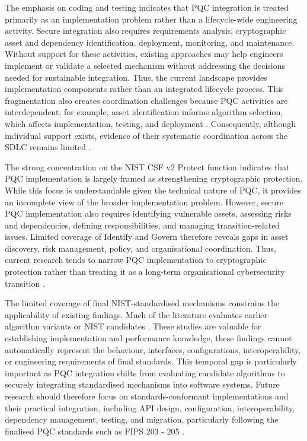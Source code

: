 \documentclass[letterpaper,twocolumn,10pt]{article}
\begin{document}
The emphasis on coding and testing indicates that PQC integration is treated primarily as an implementation problem rather than a lifecycle-wide engineering activity. Secure integration also requires requirements analysis, cryptographic asset and dependency identification, deployment, monitoring, and maintenance. Without support for these activities, existing approaches may help engineers implement or validate a selected mechanism without addressing the decisions needed for sustainable integration. Thus, the current landscape provides implementation components rather than an integrated lifecycle process. This fragmentation also creates coordination challenges because PQC activities are interdependent; for example, asset identification informs algorithm selection, which affects implementation, testing, and deployment \cite{anonymous_pqc_sok_2026}. Consequently, although individual support exists, evidence of their systematic coordination across the SDLC remains limited \cite{Ana_decisionAlgo, Ana_huelsing2021wireguard, Ana_ojha2025adoption, Ana_tsili_scalable_2025, Ana_kannwischer_improving_2022, Ana_e27020212}.

The strong concentration on the NIST CSF v2 Protect function indicates that PQC implementation is largely framed as strengthening cryptographic protection. While this focus is understandable given the technical nature of PQC, it provides an incomplete view of the broader implementation problem. However, secure PQC implementation also requires identifying vulnerable assets, assessing risks and dependencies, defining responsibilities, and managing transition-related issues. Limited coverage of Identify and Govern therefore reveals gaps in asset discovery, risk management, policy, and organisational coordination. Thus, current research tends to narrow PQC implementation to cryptographic protection rather than treating it as a long-term organisational cybersecurity transition \cite{Ana_decisionAlgo}.

The limited coverage of final NIST-standardised mechanisms constrains the applicability of existing findings. Much of the literature evaluates earlier algorithm variants or NIST candidates \cite{Ana_ojha2025adoption, Ana_tsili_scalable_2025, Ana_e27020212, Ana_hekkala_implementing_2023, Ana_huelsing2021wireguard, Ana_saucedo-estrada_post-quantum_2020}. These studies are valuable for establishing implementation and performance knowledge, these findings cannot automatically represent the behaviour, interfaces, configurations, interoperability, or engineering requirements of final standards. This temporal gap is particularly important as PQC integration shifts from evaluating candidate algorithms to securely integrating standardised mechanisms into software systems. Future research should therefore focus on standards-conformant implementations and their practical integration, including API design, configuration, interoperability, dependency management, testing, and migration, particularly following the finalised PQC standards such as FIPS 203 - 205 \cite{nist_fips_203_2024,nist_fips_204_2024,nist_fips_205_2024}.
\end{document}
